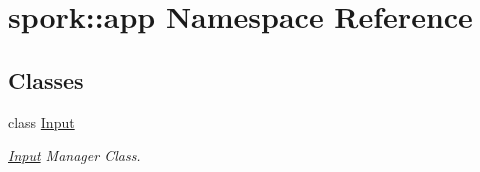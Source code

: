 \hypertarget{namespacespork_1_1app}{}\section{spork\+:\+:app Namespace Reference}
\label{namespacespork_1_1app}
\subsection*{Classes}
\begin{DoxyCompactItemize}
\item 
class \hyperlink{classspork_1_1app_1_1_input}{Input}
\begin{DoxyCompactList}\small\item\em \hyperlink{classspork_1_1app_1_1_input}{Input} Manager Class. \end{DoxyCompactList}\end{DoxyCompactItemize}
